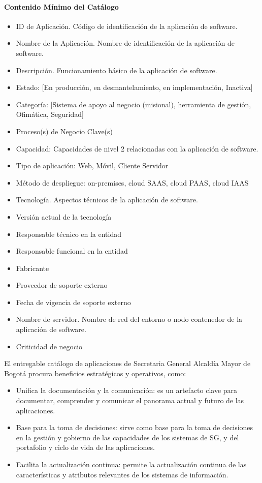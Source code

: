 \documentclass[
	a4paper, %
	12pt, %
]{include/CSSullivanBusinessReport}
\def\tightlist{}
\begin{document}
\paragraph{Contenido Mínimo del
Catálogo}\label{sec:contenido-muxednimo-del-catuxe1logo}

\begin{itemize}
\tightlist
\item
  ID de Aplicación. Código de identificación de la aplicación de
  software.
\item
  Nombre de la Aplicación. Nombre de identificación de la aplicación de
  software.
\item
  Descripción. Funcionamiento básico de la aplicación de software.
\item
  Estado: {[}En producción, en desmantelamiento, en implementación,
  Inactiva{]}
\item
  Categoría: {[}Sistema de apoyo al negocio (misional), herramienta de
  gestión, Ofimática, Seguridad{]}
\item
  Proceso(s) de Negocio Clave(s)
\item
  Capacidad: Capacidades de nivel 2 relacionadas con la aplicación de
  software.
\item
  Tipo de aplicación: Web, Móvil, Cliente Servidor
\item
  Método de despliegue: on-premises, cloud SAAS, cloud PAAS, cloud IAAS
\item
  Tecnología. Aspectos técnicos de la aplicación de software.
\item
  Versión actual de la tecnología
\item
  Responsable técnico en la entidad
\item
  Responsable funcional en la entidad
\item
  Fabricante
\item
  Proveedor de soporte externo
\item
  Fecha de vigencia de soporte externo
\item
  Nombre de servidor. Nombre de red del entorno o nodo contenedor de la
  aplicación de software.
\item
  Criticidad de negocio
\end{itemize}

El entregable catálogo de aplicaciones de Secretaria General Alcaldía
Mayor de Bogotá procura beneficios estratégicos y operativos, como:

\begin{itemize}
\tightlist
\item
  Unifica la documentación y la comunicación: es un artefacto clave para
  documentar, comprender y comunicar el panorama actual y futuro de las
  aplicaciones.
\item
  Base para la toma de decisiones: sirve como base para la toma de
  decisiones en la gestión y gobierno de las capacidades de los sistemas
  de SG, y del portafolio y ciclo de vida de las aplicaciones.
\item
  Facilita la actualización continua: permite la actualización continua
  de las características y atributos relevantes de los sistemas de
  información.
\end{itemize}
\end{document}
